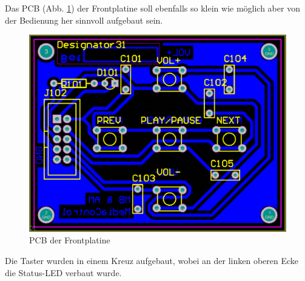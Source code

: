 Das PCB (Abb. \ref {fig:4.1.9.3.1}) der Frontplatine soll ebenfalls so klein wie möglich aber von der Bedienung her sinnvoll aufgebaut sein.
\begin{figure} [H]
	\centering
	\includegraphics[width=1\textwidth]{img/BTModul/front_pcb.png}
	\caption{PCB der Frontplatine}\label {fig:4.1.9.3.1}
\end{figure}
Die Taster wurden in einem Kreuz aufgebaut, wobei an der linken oberen Ecke die Status-LED verbaut wurde.







